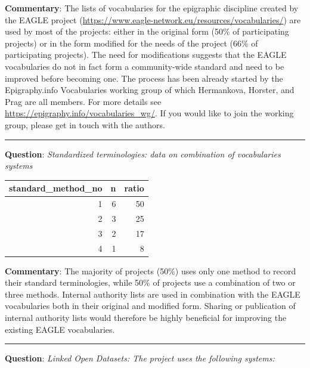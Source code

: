 \documentclass[
  10pt,
]{article}
\begin{document}
\textbf{Commentary}: The lists of vocabularies for the epigraphic
discipline created by the EAGLE project
(\url{https://www.eagle-network.eu/resources/vocabularies/}) are used by
most of the projects: either in the original form (50\% of participating
projects) or in the form modified for the needs of the project (66\% of
participating projects). The need for modifications suggests that the
EAGLE vocabularies do not in fact form a community-wide standard and
need to be improved before becoming one. The process has been already
started by the Epigraphy.info Vocabularies working group of which
Hermankova, Horster, and Prag are all members. For more details see
\url{https://epigraphy.info/vocabularies_wg/}. If you would like to join
the working group, please get in touch with the authors.

\begin{center}\rule{0.5\linewidth}{0.5pt}\end{center}

\textbf{Question}: \emph{Standardized terminologies: data on combination
of vocabularies systems}

\begin{longtable}[]{@{}rrr@{}}
\toprule
standard\_method\_no & n & ratio \\
\midrule
\endhead
1 & 6 & 50 \\
2 & 3 & 25 \\
3 & 2 & 17 \\
4 & 1 & 8 \\
\bottomrule
\end{longtable}

\textbf{Commentary}: The majority of projects (50\%) uses only one
method to record their standard terminologies, while 50\% of projects
use a combination of two or three methods. Internal authority lists are
used in combination with the EAGLE vocabularies both in their original
and modified form. Sharing or publication of internal authority lists
would therefore be highly beneficial for improving the existing EAGLE
vocabularies.

\begin{center}\rule{0.5\linewidth}{0.5pt}\end{center}

\textbf{Question}: \emph{Linked Open Datasets: The project uses the
following systems:}
\end{document}
